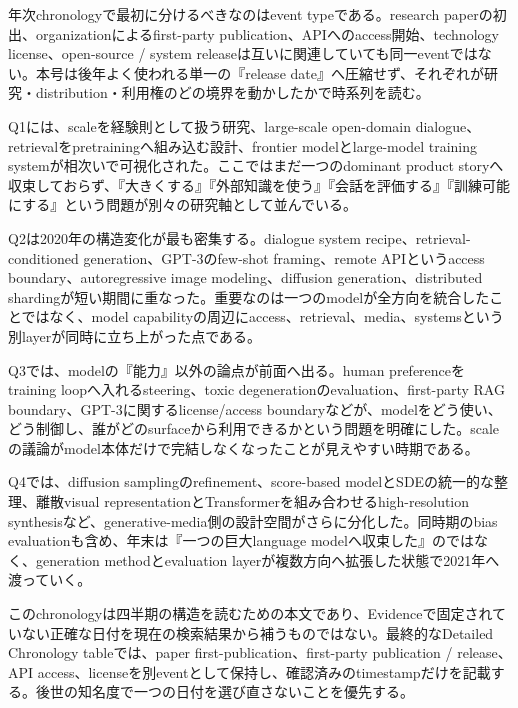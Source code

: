 年次chronologyで最初に分けるべきなのはevent typeである。research paperの初出、organizationによるfirst-party publication、APIへのaccess開始、technology license、open-source / system releaseは互いに関連していても同一eventではない。本号は後年よく使われる単一の『release date』へ圧縮せず、それぞれが研究・distribution・利用権のどの境界を動かしたかで時系列を読む。


Q1には、scaleを経験則として扱う研究、large-scale open-domain dialogue、retrievalをpretrainingへ組み込む設計、frontier modelとlarge-model training systemが相次いで可視化された。ここではまだ一つのdominant product storyへ収束しておらず、『大きくする』『外部知識を使う』『会話を評価する』『訓練可能にする』という問題が別々の研究軸として並んでいる。


Q2は2020年の構造変化が最も密集する。dialogue system recipe、retrieval-conditioned generation、GPT-3のfew-shot framing、remote APIというaccess boundary、autoregressive image modeling、diffusion generation、distributed shardingが短い期間に重なった。重要なのは一つのmodelが全方向を統合したことではなく、model capabilityの周辺にaccess、retrieval、media、systemsという別layerが同時に立ち上がった点である。


Q3では、modelの『能力』以外の論点が前面へ出る。human preferenceをtraining loopへ入れるsteering、toxic degenerationのevaluation、first-party RAG boundary、GPT-3に関するlicense/access boundaryなどが、modelをどう使い、どう制御し、誰がどのsurfaceから利用できるかという問題を明確にした。scaleの議論がmodel本体だけで完結しなくなったことが見えやすい時期である。


Q4では、diffusion samplingのrefinement、score-based modelとSDEの統一的な整理、離散visual representationとTransformerを組み合わせるhigh-resolution synthesisなど、generative-media側の設計空間がさらに分化した。同時期のbias evaluationも含め、年末は『一つの巨大language modelへ収束した』のではなく、generation methodとevaluation layerが複数方向へ拡張した状態で2021年へ渡っていく。


このchronologyは四半期の構造を読むための本文であり、Evidenceで固定されていない正確な日付を現在の検索結果から補うものではない。最終的なDetailed Chronology tableでは、paper first-publication、first-party publication / release、API access、licenseを別eventとして保持し、確認済みのtimestampだけを記載する。後世の知名度で一つの日付を選び直さないことを優先する。
